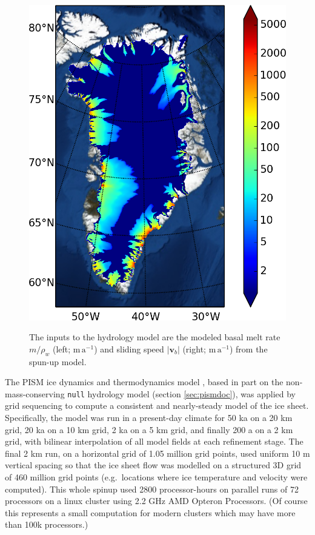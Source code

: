 \documentclass[gmd]{copernicus}   %
\newcommand\bv{\mathbf{v}}
\begin{document}
\begin{figure}[ht]
{\includegraphics[height=\grnht,keepaspectratio=true]{g2km-init-velbase-mag}}
\caption{The inputs to the hydrology model are the modeled basal melt rate $m/\rho_w$ (left; $\mathrm{m}\,\mathrm{a}^{-1}$) and sliding speed $|\bv_b|$ (right; $\mathrm{m}\,\mathrm{a}^{-1}$) from the spun-up model.}
\label{fig:Greenhydroinputs}
\end{figure}

The PISM ice dynamics and thermodynamics model \citep{BBssasliding,Winkelmannetal2011,AschwandenBuelerKhroulevBlatter}, based in part on the non-mass-conserving \texttt{null} hydrology model (section \ref{sec:pismdoc}), was applied by grid sequencing to compute a consistent and nearly-steady model of the ice sheet.  Specifically, the model was run in a present-day climate for 50 ka on a 20 km grid, 20 ka on a 10 km grid, 2 ka on a 5 km grid, and finally 200 a on a 2 km grid, with bilinear interpolation of all model fields at each refinement stage.  The final 2 km run, on a horizontal grid of 1.05 million grid points, used uniform 10 m vertical spacing so that the ice sheet flow was modelled on a structured 3D grid of 460 million grid points (e.g.~locations where ice temperature and velocity were computed).  This whole spinup used 2800 processor-hours on parallel runs of 72 processors on a linux cluster using 2.2 GHz AMD Opteron Processors.  (Of course this represents a small computation for modern clusters which may have more than 100k processors.)
\end{document}
